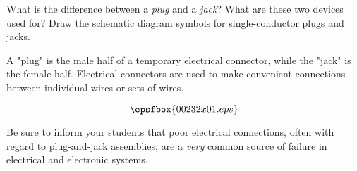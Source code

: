 

What is the difference between a {\it plug} and a {\it jack}?  What are these two devices used for?  Draw the schematic diagram symbols for single-conductor plugs and jacks.







A "plug" is the male half of a temporary electrical connector, while the "jack" is the female half.  Electrical connectors are used to make convenient connections between individual wires or sets of wires.

$$\epsfbox{00232x01.eps}$$







Be sure to inform your students that poor electrical connections, often with regard to plug-and-jack assemblies, are a {\it very} common source of failure in electrical and electronic systems.




